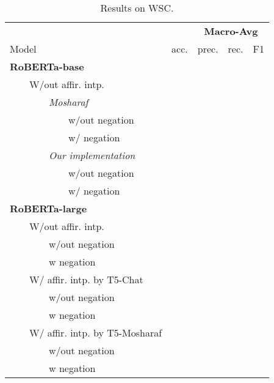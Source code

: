 \begin{table*}
\centering
\begin{tabular}{lrrrr}
\toprule
&& \multicolumn{3}{c}{\textbf{Macro-Avg}} \\
Model & acc. & prec. & rec. & F1 \\
\midrule
\textbf{RoBERTa-base} \\
~~~~W/out affir. intp. \\
~~~~~~~~\textit{Mosharaf} \\
~~~~~~~~~~~~w/out negation \\ 
~~~~~~~~~~~~w/ negation \\ 
\midrule
~~~~~~~~\textit{Our implementation} \\
~~~~~~~~~~~~w/out negation \\
~~~~~~~~~~~~w/ negation \\ 
\bottomrule
\textbf{RoBERTa-large} \\
~~~~W/out affir. intp. \\
~~~~~~~~w/out negation \\ 
~~~~~~~~w negation \\ 
\midrule
~~~~W/ affir. intp. by T5-Chat \\
~~~~~~~~w/out negation \\ 
~~~~~~~~w negation \\ 
\midrule
~~~~W/ affir. intp. by T5-Mosharaf \\
~~~~~~~~w/out negation \\ 
~~~~~~~~w negation \\ 
\bottomrule
\end{tabular}
\caption{Results on WSC.}
\end{table*}